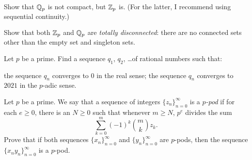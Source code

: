 \section{\problemhead}
\begin{dproblem}
	[$\ZZ_p$ is compact]
	Show that $\mathbb Q_p$ is not compact, but $\ZZ_p$ is.
	(For the latter, I recommend using sequential continuity.)
\end{dproblem}
\begin{dproblem}
	Show that both $\ZZ_p$ and $\mathbb Q_p$ are \emph{totally disconnected}:
	there are no connected sets other than the empty set and singleton sets.
\end{dproblem}

\begin{problem}
	Let $p$ be a prime.
	Find a sequence $q_1$, $q_2$, \dots of rational numbers such that:
	\begin{itemize}
	\ii the sequence $q_n$ converges to $0$ in the real sense;
	\ii the sequence $q_n$ converges to $2021$ in the $p$-adic sense.
	\end{itemize}
\end{problem}

\begin{problem}
	Let $p$ be a prime.
	We say that a sequence of integers $\{z_n\}_{n=0}^\infty$
	is a \emph{$p$-pod} if for each $e \geq 0$,
	there is an $N \geq 0$ such that whenever $m \geq N$,
	$p^e$ divides the sum
	\[ \sum_{k=0}^m (-1)^k \binom mk z_k. \]
	Prove that if both sequences $\{x_n\}_{n=0}^\infty$
	and $\{y_n\}_{n=0}^\infty$ are $p$-pods,
	then the sequence $\{x_n y_n\}_{n=0}^\infty$ is a $p$-pod.
\end{problem}
